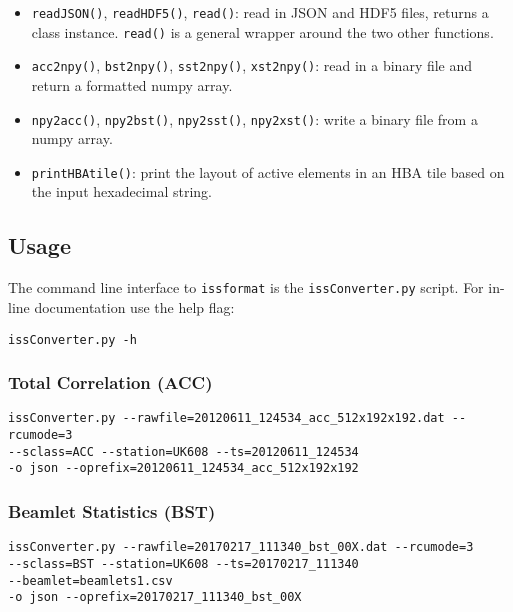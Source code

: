 \documentclass[10pt,a4paper]{article}
\begin{document}
\begin{itemize}
    \item \texttt{readJSON()}, \texttt{readHDF5()}, \texttt{read()}: read in
    JSON and HDF5 files, returns a class instance. \texttt{read()} is a general
    wrapper around the two other functions.
    \item \texttt{acc2npy()}, \texttt{bst2npy()}, \texttt{sst2npy()},
    \texttt{xst2npy()}: read in a binary file and return a formatted numpy
    array.
    \item \texttt{npy2acc()}, \texttt{npy2bst()}, \texttt{npy2sst()},
    \texttt{npy2xst()}: write a binary file from a numpy array.
    \item \texttt{printHBAtile()}: print the layout of active elements in an HBA
    tile based on the input hexadecimal string.
\end{itemize}

\subsection{Usage}

The command line interface to \texttt{issformat} is the \texttt{issConverter.py}
script. For in-line documentation use the help flag:

\begin{verbatim}
issConverter.py -h
\end{verbatim}

\subsubsection{Total Correlation (ACC)}

\begin{verbatim}
issConverter.py --rawfile=20120611_124534_acc_512x192x192.dat --rcumode=3
--sclass=ACC --station=UK608 --ts=20120611_124534
-o json --oprefix=20120611_124534_acc_512x192x192
\end{verbatim}

\subsubsection{Beamlet Statistics (BST)}

\begin{verbatim}
issConverter.py --rawfile=20170217_111340_bst_00X.dat --rcumode=3
--sclass=BST --station=UK608 --ts=20170217_111340
--beamlet=beamlets1.csv
-o json --oprefix=20170217_111340_bst_00X
\end{verbatim}
\end{document}
